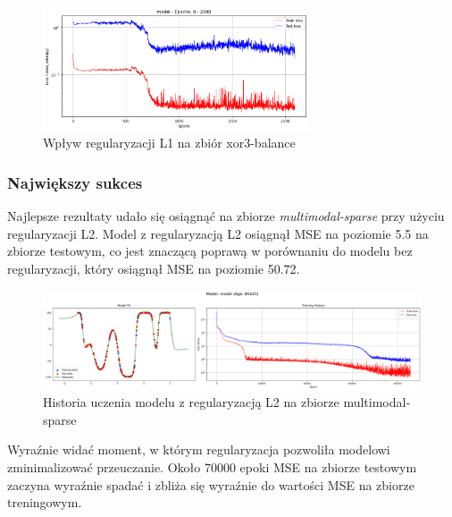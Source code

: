 \documentclass{article}
\begin{document}
\begin{figure}[H]
    \centering
    \includegraphics[width=0.7\textwidth]{img/nn6/xor_reg_hist.png}
    \caption{Wpływ regularyzacji L1 na zbiór xor3-balance}
\end{figure}

\subsubsection*{Największy sukces}
Najlepsze rezultaty udało się osiągnąć na zbiorze \textit{multimodal-sparse} przy użyciu regularyzacji L2. Model z regularyzacją L2 osiągnął MSE na poziomie 5.5 na zbiorze testowym, co jest znaczącą poprawą w porównaniu do modelu bez regularyzacji, który osiągnął MSE na poziomie 50.72.

\begin{figure}[H]
    \centering
    \includegraphics[width=\textwidth]{img/nn6/multimodal-sparse.png}
    \caption{Historia uczenia modelu z regularyzacją L2 na zbiorze multimodal-sparse}
\end{figure}

Wyraźnie widać moment, w którym regularyzacja pozwoliła modelowi zminimalizować przeuczanie. Około 70000 epoki MSE na zbiorze testowym zaczyna wyraźnie spadać i zbliża się wyraźnie do wartości MSE na zbiorze treningowym.
\end{document}
